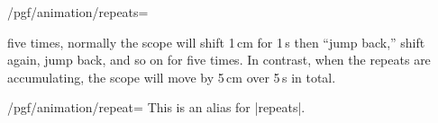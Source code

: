 \begin{key}{/pgf/animation/repeats=}
\begin{itemize}
    five times, normally the scope will shift 1\,cm for 1\,s then
    ``jump back,'' shift again, jump back, and so on for five
    times. In contrast, when the repeats are accumulating, the scope
    will move by 5\,cm over 5\,s in total.    
\begin{codeexample}[animation list={1,2,3,4,5}]
\end{codeexample}
\begin{codeexample}[animation list={1,2,3,4,5}]
\end{codeexample}
  \end{itemize}
\end{key}

\begin{key}{/pgf/animation/repeat=}
  This is an alias for |repeats|.  
\end{key}


\endinput



